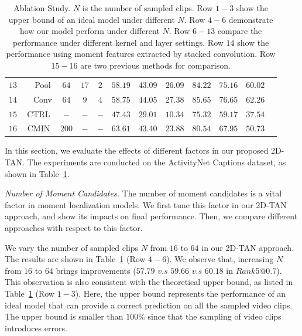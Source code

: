 \documentclass[letterpaper]{article} %
\begin{document}
\begin{table}[t]
\begin{center}
\begin{tabular}{|c|c|c|c|c|c|c|c|c|c|c|c|c|}
			$13$ & & Pool &$64$ & $17$ & $2$ & $58.19$ & $43.09$ & $26.09$ & $84.22$ & $75.16$ & $60.02$ \\
			$14$ & & Conv &$64$ & $9$ & $4$  & $58.75$ & ${44.05}$ & ${27.38}$ & ${85.65}$ & ${76.65}$ & ${62.26}$\\
			\hline
		    \hline
			$15$ & \multicolumn{2}{c|}{CTRL} & $-$ & $-$ & $-$ & $47.43$ & $29.01$ & $10.34$ & $75.32$ & $59.17$ & $37.54$  \\
			$16$ & \multicolumn{2}{c|}{CMIN} & $200$ & $-$ & $-$ & $63.61$ & $43.40$ & $23.88$ & $80.54$ & $67.95$ & $50.73$\\
			\hline
		\end{tabular}
	\end{center}
	\caption{Ablation Study.
	$N$ is the number of sampled clips.
	Row $1-3$ show the upper bound of an ideal model under different $N$.
	Row $4-6$ demonstrate how our model perform under different $N$.
	Row $6-13$ compare the performance under different kernel and layer settings.
	Row $14$ show the performance using moment features  extracted by stacked convolution.
	Row $15-16$ are two previous methods for comparison.
	}
	\label{tab:ablation_study}
\end{table}

In this section, we evaluate the effects of different factors in our proposed 2D-TAN.
The experiments are conducted on the ActivityNet Captions dataset, as shown in Table~\ref{tab:ablation_study}.

\textit{Number of Moment Candidates. }
The number of moment candidates is a vital factor in moment localization models.
We first tune this factor in our 2D-TAN approach, and show its impacts on final performance. Then, we compare different approaches with respect to this factor.


We vary the number of sampled clips $N$ from $16$ to $64$ in our 2D-TAN approach. The results are shown in Table~\ref{tab:ablation_study} (Row $4-6$). We observe that, increasing $N$ from $16$ to $64$ brings  improvements ($57.79$ $v.s$ $59.66$ $v.s$ $60.18$ in $Rank5@0.7$). This observation is also consistent with the theoretical upper bound, as listed in Table~\ref{tab:ablation_study} (Row $1-3$). Here, the upper bound represents the performance of an ideal model that can provide a correct prediction on all the sampled video clips. The upper bound is smaller than $100\%$ since that the sampling of video clips introduces errors.
\end{document}
